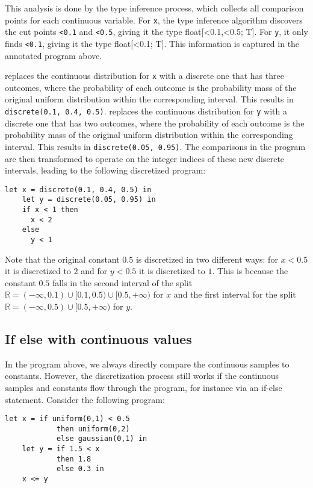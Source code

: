 \documentclass[acmsmall,screen,dvipsnames,x11names,nonacm,anonymous,review]{acmart}
\newcommand{\codetype}[1]{\textcolor{typecolor}{\ttfamily\small#1}}
\newcommand{\Slice}{\text{\scshape Slice}\xspace}
\newcommand{\R}{\mathbb{R}}
\begin{document}
This analysis is done by the type inference process, which collects all comparison points for each continuous variable. For \texttt{x}, the type inference algorithm discovers the cut points \texttt{<0.1} and \texttt{<0.5}, giving it the type \codetype{float[<0.1,<0.5; T]}. For \texttt{y}, it only finds \texttt{<0.1}, giving it the type \codetype{float[<0.1; T]}. This information is captured in the annotated program above.

\Slice replaces the continuous distribution for \texttt{x} with a discrete one that has three outcomes, where the probability of each outcome is the probability mass of the original uniform distribution within the corresponding interval. This results in \texttt{discrete(0.1, 0.4, 0.5)}.
\Slice replaces the continuous distribution for \texttt{y} with a discrete one that has two outcomes, where the probability of each outcome is the probability mass of the original uniform distribution within the corresponding interval. This results in \texttt{discrete(0.05, 0.95)}. The comparisons in the program are then transformed to operate on the integer indices of these new discrete intervals, leading to the following discretized program:

\begin{lstlisting}[aboveskip=1em,belowskip=1em]
    let x = discrete(0.1, 0.4, 0.5) in
    let y = discrete(0.05, 0.95) in
    if x < 1 then
      x < 2
    else
      y < 1
\end{lstlisting}

Note that the original constant $0.5$ is discretized in two different ways: for $x < 0.5$ it is discretized to $2$ and for $y < 0.5$ it is discretized to $1$. This is because the constant $0.5$ falls in the second interval of the split $\R = (-\infty, 0.1) \cup [0.1, 0.5) \cup [0.5, +\infty)$ for $x$ and the first interval for the split $\R = (-\infty, 0.5) \cup [0.5, +\infty)$ for $y$.

\subsection{If else with continuous values}

In the program above, we always directly compare the continuous samples to constants.
However, the discretization process still works if the continuous samples and constants flow through the program, for instance via an if-else statement.
Consider the following program:

\begin{lstlisting}[aboveskip=1em,belowskip=1em,escapechar=!]
    let x = if uniform(0,1) < 0.5 
            then uniform(0,2) 
            else gaussian(0,1) in
    let y = if 1.5 < x
            then 1.8
            else 0.3 in
    x <= y
\end{lstlisting}
\end{document}
